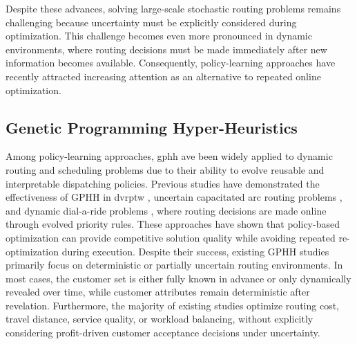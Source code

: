 \documentclass[pdflatex]{sn-jnl}
\begin{document}
Despite these advances, solving large-scale stochastic routing problems remains challenging because uncertainty must be explicitly considered during optimization. This challenge becomes even more pronounced in dynamic environments, where routing decisions must be made immediately after new information becomes available. Consequently, policy-learning approaches have recently attracted increasing attention as an alternative to repeated online optimization.
\subsection{Genetic Programming Hyper-Heuristics}
Among policy-learning approaches, \gls{gphh} ave been widely applied to dynamic routing and scheduling problems due to their ability to evolve reusable and interpretable dispatching policies. Previous studies have demonstrated the effectiveness of GPHH in \gls{dvrptw} \cite{jacobsen2017evolving, tam2025evolving}, uncertain capacitated arc routing problems \cite{maclachlan2020genetic}, and dynamic dial-a-ride problems \cite{huang2025genetic}, where routing decisions are made online through evolved priority rules. These approaches have shown that policy-based optimization can provide competitive solution quality while avoiding repeated re-optimization during execution. 
Despite their success, existing GPHH studies primarily focus on deterministic or partially uncertain routing environments. In most cases, the customer set is either fully known in advance or only dynamically revealed over time, while customer attributes remain deterministic after revelation. Furthermore, the majority of existing studies optimize routing cost, travel distance, service quality, or workload balancing, without explicitly considering profit-driven customer acceptance decisions under uncertainty.
\end{document}
